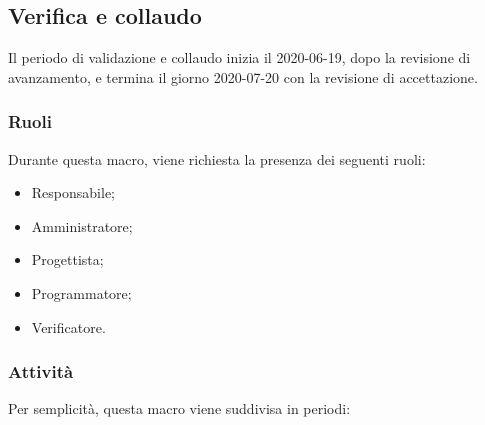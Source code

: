 \documentclass[../piano-di-progetto.tex]{subfiles}
\begin{document}
\subsection{Verifica e collaudo}
Il periodo di validazione e collaudo inizia il 2020-06-19, dopo la revisione di avanzamento, e termina il giorno 2020-07-20 con la revisione di accettazione. 

\subsubsection{Ruoli}
Durante questa macro, viene richiesta la presenza dei seguenti ruoli:
\begin{itemize}
    \item Responsabile;
    \item Amministratore;
    \item Progettista;
    \item Programmatore;
    \item Verificatore.
\end{itemize}

\subsubsection{Attività}
Per semplicità, questa macro viene suddivisa in periodi:
\end{document}
